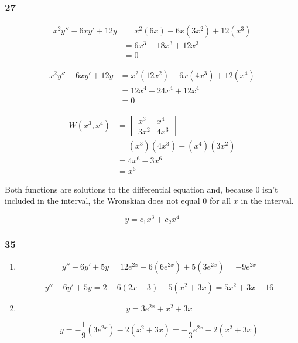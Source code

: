 \documentclass{article}
\begin{document}
\subsubsection{27}

\begin{align*}
  x^2 y'' - 6xy' + 12y & = x^2 (6x) - 6x (3x^2) + 12 (x^3) \\
                       & = 6x^3 - 18x^3 + 12x^3            \\
                       & = 0
\end{align*}

\begin{align*}
  x^2 y'' - 6xy' + 12y & = x^2 (12x^2) - 6x (4x^3) + 12 (x^4) \\
                       & = 12x^4 - 24x^4 + 12x^4              \\
                       & = 0
\end{align*}

\begin{align*}
  W(x^3, x^4) & = \begin{vmatrix}
                    x^3  & x^4  \\
                    3x^2 & 4x^3
                  \end{vmatrix}              \\
              & = (x^3) (4x^3) - (x^4) (3x^2) \\
              & = 4x^6 - 3x^6                 \\
              & = x^6
\end{align*}

Both functions are solutions to the differential equation and, because $0$ isn't included in the interval, the Wronskian does not equal $0$ for all $x$ in the interval.

\[y = c_1 x^3 + c_2 x^4\]

\subsubsection{35}

\begin{enumerate}
  \item

        \[y'' - 6y' + 5y = 12e^{2x} - 6(6e^{2x}) + 5(3e^{2x}) = -9e^{2x}\]

        \[y'' - 6y' + 5y = 2 - 6(2x + 3) + 5(x^2 + 3x) = 5x^2 + 3x - 16\]

  \item

        \[y = 3e^{2x} + x^2 + 3x\]

        \[y = -\frac{1}{9}(3e^{2x}) - 2(x^2 + 3x) = -\frac{1}{3} e^{2x} - 2(x^2 + 3x)\]
\end{enumerate}
\end{document}
